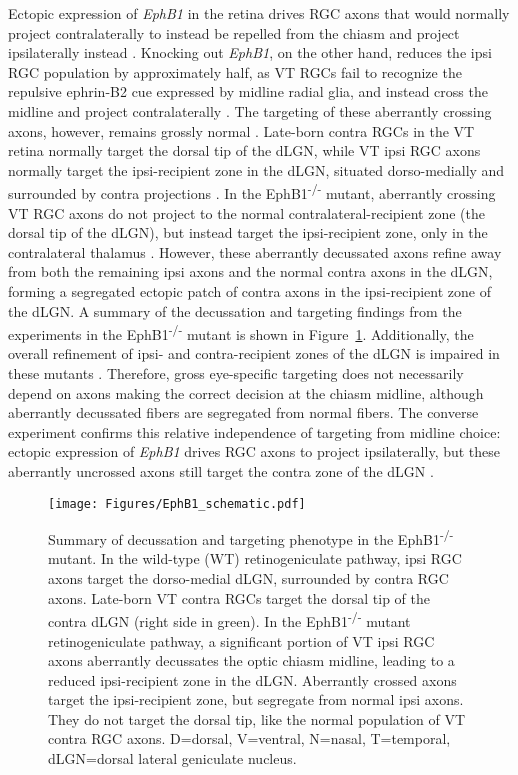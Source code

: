 Ectopic expression of \emph{EphB1} in the retina drives RGC axons that would normally project contralaterally to instead be repelled from the chiasm and project ipsilaterally instead \cite{petros2009specificity}.
Knocking out \emph{EphB1}, on the other hand, reduces the ipsi RGC population by approximately half, as VT RGCs fail to recognize the repulsive ephrin-B2 cue expressed by midline radial glia, and instead cross the midline and project contralaterally \cite{williams2003ephrin}.
The targeting of these aberrantly crossing axons, however, remains grossly normal \cite{rebsam2009switching}.
Late-born contra RGCs in the VT retina normally target the dorsal tip of the dLGN, while VT ipsi RGC axons normally target the ipsi-recipient zone in the dLGN, situated dorso-medially and surrounded by contra projections \cite{rebsam2009switching,pfeiffenberger2006ephrin}.
In the EphB1\textsuperscript{-/-} mutant, aberrantly crossing VT RGC axons do not project to the normal contralateral-recipient zone (the dorsal tip of the dLGN), but instead target the ipsi-recipient zone, only in the contralateral thalamus \cite{rebsam2009switching}.
However, these aberrantly decussated axons refine away from both the remaining ipsi axons and the normal contra axons in the dLGN, forming a segregated ectopic patch of contra axons in the ipsi-recipient zone of the dLGN.
A summary of the decussation and targeting findings from the experiments in the EphB1\textsuperscript{-/-} mutant is shown in Figure~\ref{EphB1schematic}.
Additionally, the overall refinement of ipsi- and contra-recipient zones of the dLGN is impaired in these mutants \cite{rebsam2009switching}.
Therefore, gross eye-specific targeting does not necessarily depend on axons making the correct decision at the chiasm midline, although aberrantly decussated fibers are segregated from normal fibers.
The converse experiment confirms this relative independence of targeting from midline choice: ectopic expression of \emph{EphB1} drives RGC axons to project ipsilaterally, but these aberrantly uncrossed axons still target the contra zone of the dLGN \cite{rebsam2009switching}.
\begin{figure}[hbtp]
    \begin{center}
        \texttt{[image: Figures/EphB1\_schematic.pdf]}
        \caption[Summary of decussation and targeting phenotype in the EphB1\textsuperscript{-/-} mutant.]
        {Summary of decussation and targeting phenotype in the EphB1\textsuperscript{-/-} mutant.
		In the wild-type (WT) retinogeniculate pathway, ipsi RGC axons target the dorso-medial dLGN, surrounded by contra RGC axons.
		Late-born VT contra RGCs target the dorsal tip of the contra dLGN (right side in green).
		In the EphB1\textsuperscript{-/-} mutant retinogeniculate pathway, a significant portion of VT ipsi RGC axons aberrantly decussates the optic chiasm midline, leading to a reduced ipsi-recipient zone in the dLGN.
		Aberrantly crossed axons target the ipsi-recipient zone, but segregate from normal ipsi axons.
		They do not target the dorsal tip, like the normal population of VT contra RGC axons.
		D=dorsal, V=ventral, N=nasal, T=temporal, dLGN=dorsal lateral geniculate nucleus.}
        \label{EphB1schematic}
    \end{center}
\end{figure}